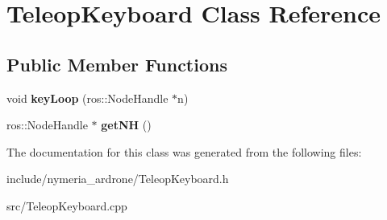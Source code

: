 \hypertarget{classTeleopKeyboard}{\section{\-Teleop\-Keyboard \-Class \-Reference}
\label{classTeleopKeyboard}
}
\subsection*{\-Public \-Member \-Functions}
\begin{DoxyCompactItemize}
\item 
\hypertarget{classTeleopKeyboard_a7829c0739622fed59aa5e66e0828d97e}{void {\bfseries key\-Loop} (ros\-::\-Node\-Handle $\ast$n)}\label{classTeleopKeyboard_a7829c0739622fed59aa5e66e0828d97e}

\item 
\hypertarget{classTeleopKeyboard_adaa0990f75d0534dc7d41a01fd24db09}{ros\-::\-Node\-Handle $\ast$ {\bfseries get\-N\-H} ()}\label{classTeleopKeyboard_adaa0990f75d0534dc7d41a01fd24db09}

\end{DoxyCompactItemize}


\-The documentation for this class was generated from the following files\-:\begin{DoxyCompactItemize}
\item 
include/nymeria\-\_\-ardrone/\-Teleop\-Keyboard.\-h\item 
src/\-Teleop\-Keyboard.\-cpp\end{DoxyCompactItemize}
